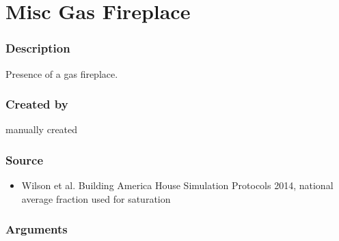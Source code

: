 \section{Misc Gas Fireplace}\label{misc_gas_fireplace}

\subsubsection{Description}\label{description-112}

Presence of a gas fireplace.

\subsubsection{Created by}\label{created-by-113}

manually created

\subsubsection{Source}\label{source-115}

\begin{itemize}
 
\item
  Wilson et al. \textquotesingle Building America House Simulation
  Protocols\textquotesingle{} 2014, national average fraction used for
  saturation
\end{itemize}

\subsubsection{Arguments}\label{arguments-76}


